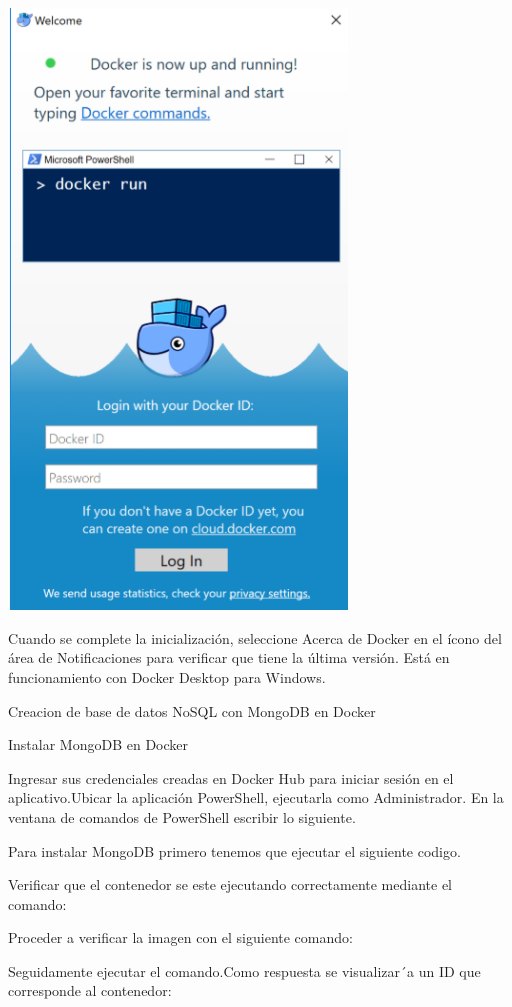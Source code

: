 \documentclass[twoside,onecolumn]{article}
\begin{document}
\begin{flushright}
\begin{itemize}
\begin{center}
		\includegraphics[width=9cm]{./Imagenes/n3}
\end{center}	
Cuando se complete la inicialización, seleccione Acerca de Docker en el ícono del área de Notificaciones para verificar que tiene la última versión.
Está en funcionamiento con Docker Desktop para Windows.

Creacion de base de datos NoSQL con MongoDB en Docker


Instalar MongoDB en Docker

Ingresar sus credenciales creadas en Docker Hub para iniciar sesión en el aplicativo.Ubicar la aplicación PowerShell, ejecutarla como Administrador. En la ventana de comandos de PowerShell escribir lo siguiente.


Para instalar MongoDB primero tenemos que ejecutar el siguiente codigo.

Verificar que el contenedor se este ejecutando correctamente mediante el comando:

Proceder a verificar la imagen con el siguiente comando:

Seguidamente ejecutar el comando.Como respuesta
se visualizar´a un ID que corresponde al contenedor:



\end{itemize}
\end{flushright}
\end{document}
